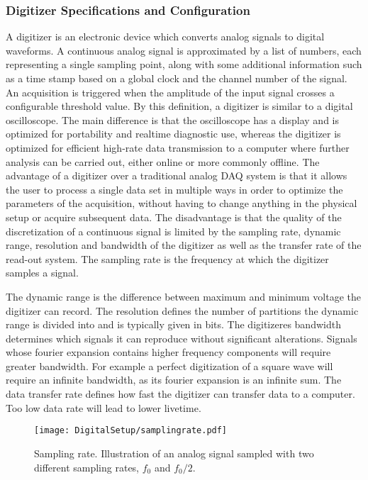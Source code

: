 \documentclass[main.tex]{subfiles}
\begin{document}
\subsubsection{Digitizer Specifications and Configuration}
A digitizer is an electronic device which converts analog signals to digital waveforms. A continuous analog signal is approximated by a list of numbers, each representing a single sampling point, along with some additional information such as a time stamp based on a global clock and the channel number of the signal. An acquisition is triggered when the amplitude of the input signal crosses a configurable threshold value.
By this definition, a digitizer is similar to a digital oscilloscope. The main difference is that the oscilloscope has a display and is optimized for portability and realtime diagnostic use, whereas the digitizer is optimized for efficient high-rate data transmission to a computer where further analysis can be carried out, either online or more commonly offline.
The advantage of a digitizer over a traditional analog DAQ system is that it allows the user to process a single data set in multiple ways in order to optimize the parameters of the acquisition, without having to change anything in the physical setup or acquire subsequent data. The disadvantage is that the quality of the discretization of a continuous signal is limited by the sampling rate, dynamic range, resolution and bandwidth of the digitizer as well as the transfer rate of the read-out system.
The sampling rate is the frequency at which the digitizer samples a signal.

The dynamic range is the difference between maximum and minimum voltage the digitizer can record. The resolution defines the number of partitions the dynamic range is divided into and is typically given in bits. The digitizeres bandwidth determines which signals it can reproduce without significant alterations. Signals whose fourier expansion contains higher frequency components will require greater bandwidth. For example a perfect digitization of a square wave will require an infinite bandwidth, as its fourier expansion is an infinite sum. The data transfer rate defines how fast the digitizer can transfer data to a computer. Too low data rate will lead to lower livetime.

\begin{figure}[ht]
	\centering
    	\texttt{[image: DigitalSetup/samplingrate.pdf]}
        \caption[Sampling rate.]{Sampling rate. Illustration of an analog signal sampled with two different sampling rates, $f_0$ and $f_0/2$.}
	    \label{fig:samplingrate} 
\end{figure}
\end{document}
